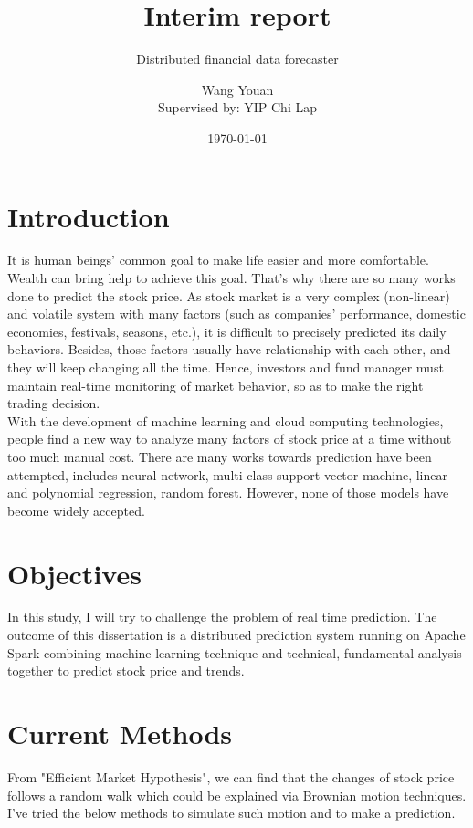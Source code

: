 \documentclass[12pt,a4paper]{scrartcl}
\date{\today}
\title{Interim report}
\subtitle{Distributed financial data forecaster}
\author{Wang Youan\\{\small Supervised by: YIP Chi Lap}}
\begin{document}
	\maketitle
	\section{Introduction}
	It is human beings' common goal to make life easier and more comfortable. Wealth can bring help to achieve this goal. That's why there are so many works done to predict the stock price. As stock market is a very complex (non-linear) and volatile system with many factors (such as companies' performance, domestic economies, festivals, seasons, etc.)\cite{chen1986economic}, it is difficult to precisely predicted its daily behaviors. Besides, those factors usually have relationship with each other, and they will keep changing all the time. Hence, investors and fund manager must maintain real-time monitoring of market behavior, so as to make the right trading decision.\\
	\indent With the development of machine learning and cloud computing technologies, people find a new way to analyze many factors of stock price at a time without too much manual cost. There are many works towards prediction have been attempted, includes neural network\cite{kimoto1990stock,naeini2010stock}, multi-class support vector machine\cite{kercheval2015modelling}, linear and polynomial regression\cite{nunnostock,alexanderstock}, random forest\cite{alexanderstock,lauretto2013evaluation}. However, none of those models have become widely accepted. 
	\section{Objectives}
	In this study, I will try to challenge the problem of real time prediction. The outcome of this dissertation is a distributed prediction system running on Apache Spark\cite{apache_spark} combining machine learning technique and technical, fundamental analysis together to predict stock price and trends.
	\section{Current Methods}
	From "Efficient Market Hypothesis"\cite{basu1977investment,sewell2011history,vacha2005dynamical}, we can find that the changes of stock price follows a random walk which could be explained via Brownian motion techniques. I've tried  the below methods to simulate such motion and to make a prediction.
\end{document}
